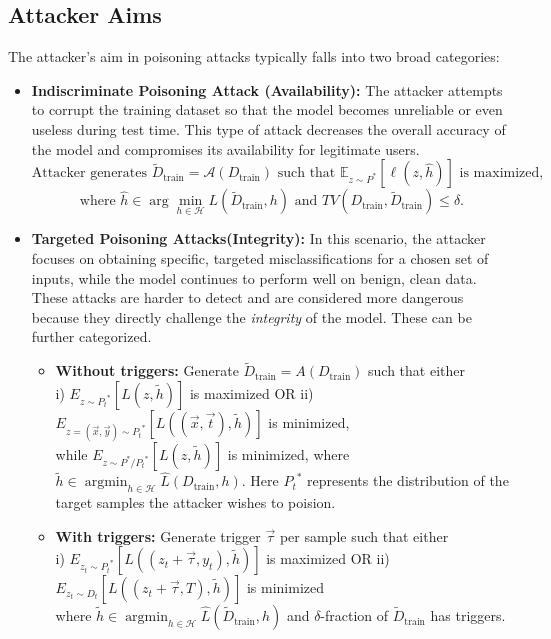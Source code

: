 \documentclass[11pt]{report}
\begin{document}
\subsection{Attacker Aims}
The attacker's aim in poisoning attacks typically falls into two broad categories:
\begin{itemize}
    \item \textbf{Indiscriminate Poisoning Attack (Availability):}  
The attacker attempts to corrupt the training dataset so that the model becomes unreliable or even useless during test time. This type of attack decreases the overall accuracy of the model and compromises its availability for legitimate users.
\[
\text{Attacker generates } \tilde{D}_{\text{train}} = \mathcal{A}(D_{\text{train}}) 
\text{ such that } 
\mathbb{E}_{z \sim P^*}[\ell(z, \hat{h})] \text{ is maximized,}
\]\[\text{where } 
\hat{h} \in \arg\min_{h \in \mathcal{H}} L(\tilde{D}_{\text{train}}, h) 
\text{ and } TV(D_{\text{train}}, \tilde{D}_{\text{train}}) \leq \delta.
\]

    
    \item \textbf{Targeted Poisoning Attacks(Integrity):}  
    In this scenario, the attacker focuses on obtaining specific, targeted misclassifications for a chosen set of inputs, while the model continues to perform well on benign, clean data. These attacks are harder to detect and are considered more dangerous because they directly challenge the \emph{integrity} of the model. These can be further categorized.
    \begin{itemize}
        \item \textbf{Without triggers: }
        Generate $\tilde{D}_{\text{train}} = A(D_{\text{train}})$ such that either \\
        i) $E_{z \sim {P_t}^*}[L(z, \tilde{h})]$ is maximized \quad OR \quad ii) $E_{z=(\vec{x}, \vec{y}) \sim  {P_t}^*}[L((\vec{x}, \vec{t}), \tilde{h})]$ is minimized, \\[5pt]
        while $E_{z \sim P^*/{P_t}^*}[L(z, \tilde{h})]$ is minimized, where $\tilde{h} \in \operatorname*{argmin}_{h \in \mathcal{H}} \widehat{L}(D_{\text{train}}, h)$. Here ${P_t}^*$  represents the distribution of the target samples the attacker wishes to poision.

        \item \textbf{With triggers: }
        Generate trigger $\vec{\tau}$ per sample such that either \\[5pt]
        i) $E_{z_t \sim {P_t}^*}[L((z_t + \vec{\tau}, y_t), \tilde{h})]$ is maximized \quad OR \quad ii) $E_{z_t \sim D_t}[L((z_t + \vec{\tau}, T), \tilde{h})]$ is minimized \\[5pt]
        where $\tilde{h} \in \operatorname*{argmin}_{h \in \mathcal{H}} \widehat{L}(\tilde{D}_{\text{train}}, h)$ and $\delta$-fraction of $\tilde{D}_{\text{train}}$ has triggers.
    \end{itemize}
\end{itemize}
\end{document}
